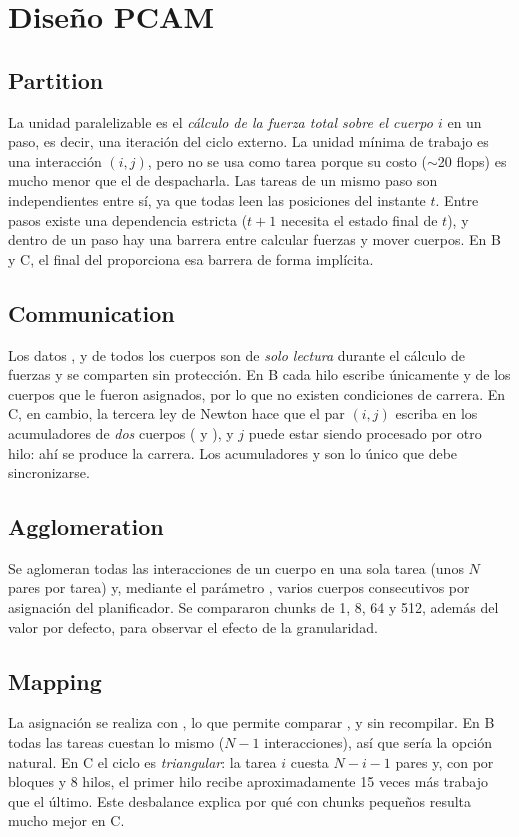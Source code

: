 \section{Diseño PCAM}

\subsection*{Partition}
La unidad paralelizable es el \emph{cálculo de la fuerza total sobre el cuerpo $i$} en un paso, es
decir, una iteración del ciclo externo. La unidad mínima de trabajo es una interacción $(i,j)$, pero no
se usa como tarea porque su costo ($\sim$20 flops) es mucho menor que el de despacharla. Las tareas de
un mismo paso son independientes entre sí, ya que todas leen las posiciones del instante $t$. Entre
pasos existe una dependencia estricta ($t+1$ necesita el estado final de $t$), y dentro de un paso hay
una barrera entre calcular fuerzas y mover cuerpos. En B y C, el final del 
proporciona esa barrera de forma implícita.

\subsection*{Communication}
Los datos ,  y  de todos los cuerpos son de \emph{solo lectura} durante el
cálculo de fuerzas y se comparten sin protección. En B cada hilo escribe únicamente  y
 de los cuerpos que le fueron asignados, por lo que no existen condiciones de carrera. En C,
en cambio, la tercera ley de Newton hace que el par $(i,j)$ escriba en los acumuladores de \emph{dos}
cuerpos ( y ), y $j$ puede estar siendo procesado por otro hilo: ahí se
produce la carrera. Los acumuladores  y  son lo único que debe sincronizarse.

\subsection*{Agglomeration}
Se aglomeran todas las interacciones de un cuerpo en una sola tarea (unos $N$ pares por tarea) y, mediante
el parámetro , varios cuerpos consecutivos por asignación del planificador. Se compararon
chunks de 1, 8, 64 y 512, además del valor por defecto, para observar el efecto de la granularidad.

\subsection*{Mapping}
La asignación se realiza con , lo que permite comparar ,
 y  sin recompilar. En B todas las tareas cuestan lo mismo ($N-1$
interacciones), así que  sería la opción natural. En C el ciclo
 es \emph{triangular}: la tarea $i$ cuesta $N-i-1$ pares y, con  por
bloques y 8 hilos, el primer hilo recibe aproximadamente 15 veces más trabajo que el último. Este
desbalance explica por qué  con chunks pequeños resulta mucho mejor en C.
